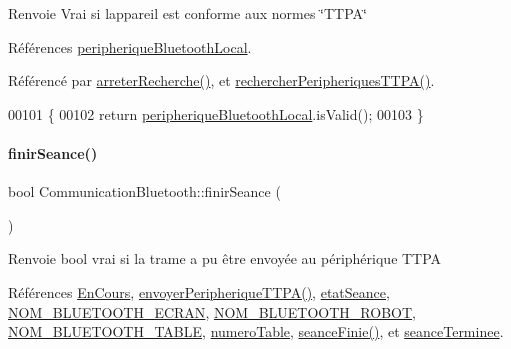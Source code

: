 \begin{DoxyReturn}{Renvoie}
Vrai si l\textquotesingle{}appareil est conforme aux normes \char`\"{}\+T\+T\+P\+A\char`\"{} 
\end{DoxyReturn}


Références \hyperlink{class_communication_bluetooth_a03c857db65a9ea5a0b944844f675e6fa}{peripherique\+Bluetooth\+Local}.



Référencé par \hyperlink{class_communication_bluetooth_ab9993bd24a2f0c8254564a36cdf16069}{arreter\+Recherche()}, et \hyperlink{class_communication_bluetooth_a4c2e2d557728c227faeb247cb8a9c482}{rechercher\+Peripheriques\+T\+T\+P\+A()}.


\begin{DoxyCode}
00101 \{
00102     \textcolor{keywordflow}{return} \hyperlink{class_communication_bluetooth_a03c857db65a9ea5a0b944844f675e6fa}{peripheriqueBluetoothLocal}.isValid();
00103 \}
\end{DoxyCode}
\mbox{\label{class_communication_bluetooth_ab2170ef9c868ac2a26b76675c71f770e}} 
\paragraph{\texorpdfstring{finir\+Seance()}{finirSeance()}}
{\footnotesize\ttfamily bool Communication\+Bluetooth\+::finir\+Seance (\begin{DoxyParamCaption}{ }\end{DoxyParamCaption})}

\begin{DoxyReturn}{Renvoie}
bool vrai si la trame a pu être envoyée au périphérique T\+T\+PA 
\end{DoxyReturn}


Références \hyperlink{class_communication_bluetooth_a414353c68cf4b316937d7c929f20d22aaec5ed2b91d232473baf3b48bcbdae105}{En\+Cours}, \hyperlink{class_communication_bluetooth_a73d95b841bf64a4463760435a41fc219}{envoyer\+Peripherique\+T\+T\+P\+A()}, \hyperlink{class_communication_bluetooth_adc66f3034d46f3964a26b62ad98e784f}{etat\+Seance}, \hyperlink{terminal-_t_t_p_a_2communicationbluetooth_8h_a2bd8beaaf0c4b59979a3f78d4c134ec8}{N\+O\+M\+\_\+\+B\+L\+U\+E\+T\+O\+O\+T\+H\+\_\+\+E\+C\+R\+AN}, \hyperlink{terminal-_t_t_p_a_2communicationbluetooth_8h_a47332bb9b30ed8b0f38fa7b5bd11fd47}{N\+O\+M\+\_\+\+B\+L\+U\+E\+T\+O\+O\+T\+H\+\_\+\+R\+O\+B\+OT}, \hyperlink{terminal-_t_t_p_a_2communicationbluetooth_8h_aa416b2be7573de0d7832248a27ba09a8}{N\+O\+M\+\_\+\+B\+L\+U\+E\+T\+O\+O\+T\+H\+\_\+\+T\+A\+B\+LE}, \hyperlink{class_communication_bluetooth_a9428f8261f0cc055e9c6fed9a61cb595}{numero\+Table}, \hyperlink{class_communication_bluetooth_aa35ab06e34cf7571c815f63af91c44a7}{seance\+Finie()}, et \hyperlink{class_communication_bluetooth_a80ddad176c95b72e083c32b39b4454cc}{seance\+Terminee}.



